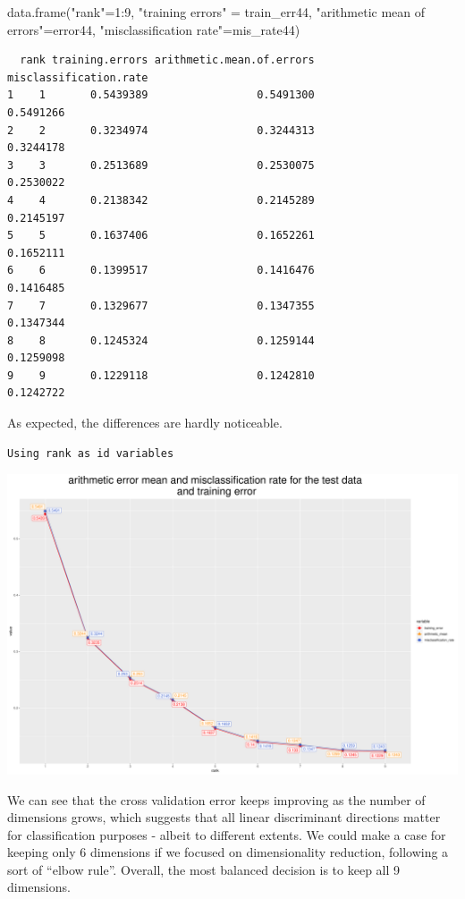 \documentclass[
  letterpaper,
  DIV=11,
  numbers=noendperiod]{scrartcl}
\newenvironment{Shaded}{\begin{snugshade}}{\end{snugshade}}
\newcommand{\DecValTok}[1]{\textcolor[rgb]{0.68,0.00,0.00}{#1}}
\newcommand{\FunctionTok}[1]{\textcolor[rgb]{0.28,0.35,0.67}{#1}}
\newcommand{\NormalTok}[1]{\textcolor[rgb]{0.00,0.23,0.31}{#1}}
\newcommand{\OtherTok}[1]{\textcolor[rgb]{0.00,0.23,0.31}{#1}}
\newcommand{\SpecialCharTok}[1]{\textcolor[rgb]{0.37,0.37,0.37}{#1}}
\newcommand{\StringTok}[1]{\textcolor[rgb]{0.13,0.47,0.30}{#1}}
\begin{document}
\begin{Shaded}
\begin{Highlighting}[]
\FunctionTok{data.frame}\NormalTok{(}\StringTok{"rank"}\OtherTok{=}\DecValTok{1}\SpecialCharTok{:}\DecValTok{9}\NormalTok{, }\StringTok{"training errors"} \OtherTok{=}\NormalTok{ train\_err44, }
       \StringTok{"arithmetic mean of errors"}\OtherTok{=}\NormalTok{error44,}
\StringTok{"misclassification rate"}\OtherTok{=}\NormalTok{mis\_rate44)}
\end{Highlighting}
\end{Shaded}

\begin{verbatim}
  rank training.errors arithmetic.mean.of.errors misclassification.rate
1    1       0.5439389                 0.5491300              0.5491266
2    2       0.3234974                 0.3244313              0.3244178
3    3       0.2513689                 0.2530075              0.2530022
4    4       0.2138342                 0.2145289              0.2145197
5    5       0.1637406                 0.1652261              0.1652111
6    6       0.1399517                 0.1416476              0.1416485
7    7       0.1329677                 0.1347355              0.1347344
8    8       0.1245324                 0.1259144              0.1259098
9    9       0.1229118                 0.1242810              0.1242722
\end{verbatim}

As expected, the differences are hardly noticeable.

\begin{verbatim}
Using rank as id variables
\end{verbatim}

\includegraphics{ProblemSet2_files/figure-pdf/unnamed-chunk-77-1.pdf}

We can see that the cross validation error keeps improving as the number
of dimensions grows, which suggests that all linear discriminant
directions matter for classification purposes - albeit to different
extents. We could make a case for keeping only 6 dimensions if we
focused on dimensionality reduction, following a sort of ``elbow rule''.
Overall, the most balanced decision is to keep all 9 dimensions.
\end{document}
